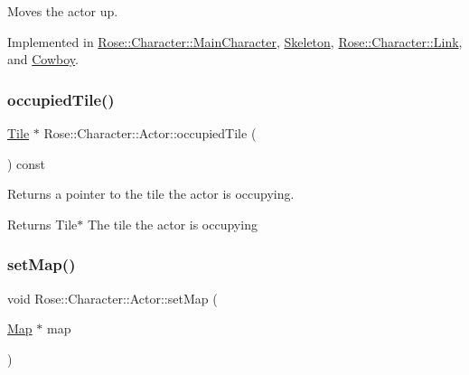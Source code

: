 Moves the actor up. 



Implemented in \mbox{\hyperlink{classRose_1_1Character_1_1MainCharacter_a9f967f5ad98eaae08948ab65bfd1a90b}{Rose\+::\+Character\+::\+Main\+Character}}, \mbox{\hyperlink{classSkeleton_a0ddbea7574ada0b5cef0cadbd4a0dd9f}{Skeleton}}, \mbox{\hyperlink{classRose_1_1Character_1_1Link_a74ccaa0d2cf7af5b1980378d0cb14b22}{Rose\+::\+Character\+::\+Link}}, and \mbox{\hyperlink{classCowboy_a3c4b0540c47492d02fa64b4740a35bcf}{Cowboy}}.

\mbox{\label{classRose_1_1Character_1_1Actor_a8a0a1dd7636a381483393049ff98f035}} 
\subsubsection{\texorpdfstring{occupiedTile()}{occupiedTile()}}
{\footnotesize\ttfamily \mbox{\hyperlink{classRose_1_1Tile}{Tile}} $\ast$ Rose\+::\+Character\+::\+Actor\+::occupied\+Tile (\begin{DoxyParamCaption}{ }\end{DoxyParamCaption}) const\hspace{0.3cm}{\ttfamily [protected]}}



Returns a pointer to the tile the actor is occupying. 

\begin{DoxyReturn}{Returns}
Tile$\ast$ The tile the actor is occupying 
\end{DoxyReturn}
\mbox{\label{classRose_1_1Character_1_1Actor_a86d4d7577bddeb7914067d937e770991}} 
\subsubsection{\texorpdfstring{setMap()}{setMap()}}
{\footnotesize\ttfamily void Rose\+::\+Character\+::\+Actor\+::set\+Map (\begin{DoxyParamCaption}\item[{\mbox{\hyperlink{classMap}{Map}} $\ast$}]{map }\end{DoxyParamCaption})\hspace{0.3cm}{\ttfamily [static]}}



